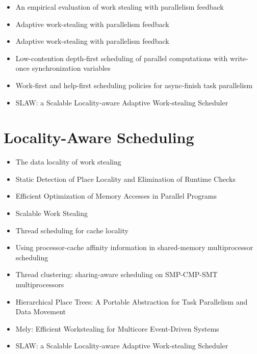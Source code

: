 \begin{itemize}
\item[\textbullet] An empirical evaluation of work stealing with
  parallelism feedback \cite{Agrawal2006}
\item[\textbullet] Adaptive work-stealing with parallelism feedback
  \cite{Agrawal2008}
\item[\textbullet] Adaptive work-stealing with parallelism feedback
  \cite{Agrawal2008a}
\item[\textbullet] Low-contention depth-first scheduling of parallel
  computations with write-once synchronization variables
  \cite{Fatourou2001}
\item[\textbullet] Work-first and help-first scheduling policies for
  async-finish task parallelism \cite{Guo2009}
\item[\textbullet] SLAW: a Scalable Locality-aware Adaptive
  Work-stealing Scheduler \cite{Guo2010}
\end{itemize}


\section*{Locality-Aware Scheduling}
\label{sec:lr-locality-aware-scheduling}

\begin{itemize}
\item[\checkmark] The data locality of work stealing \cite{Acar2002}
\item[\textbullet] Static Detection of Place Locality and Elimination
  of Runtime Checks \cite{Agarwal2008}
\item[\textbullet] Efficient Optimization of Memory Accesses in
  Parallel Programs \cite{Barik2009}
\item[\textbullet] Scalable Work Stealing \cite{Dinan2009}
\item[\textbullet] Thread scheduling for cache locality \cite{Philbin1996}
\item[\textbullet] Using processor-cache affinity information in
  shared-memory multiprocessor scheduling \cite{Squillante1993}
\item[\textbullet] Thread clustering: sharing-aware scheduling on
  SMP-CMP-SMT multiprocessors \cite{Tam2007}
\item[\textbullet] Hierarchical Place Trees: A Portable Abstraction
  for Task Parallelism and Data Movement \cite{Yan2009}
\item[\textbullet] Mely: Efficient Workstealing for Multicore
  Event-Driven Systems \cite{Gaud2010}
\item[\checkmark] SLAW: a Scalable Locality-aware Adaptive
  Work-stealing Scheduler \cite{Guo2010}
\end{itemize}


